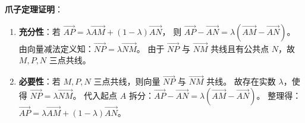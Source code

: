 \begin{proofbox}
\textbf{爪子定理证明}：
\begin{enumerate}
    \item \textbf{充分性}：若 $\vec{AP} = \lambda \vec{AM} + (1 - \lambda) \vec{AN}$，
    则 $\vec{AP} - \vec{AN} = \lambda (\vec{AM} - \vec{AN})$。
    由向量减法定义知：$\vec{NP} = \lambda \vec{NM}$。
    由于 $\vec{NP}$ 与 $\vec{NM}$ 共线且有公共点 $N$，故 $M, P, N$ 三点共线。
    
    \item \textbf{必要性}：若 $M, P, N$ 三点共线，则向量 $\vec{NP}$ 与 $\vec{NM}$ 共线。
    故存在实数 $\lambda$，使得 $\vec{NP} = \lambda \vec{NM}$。
    代入起点 $A$ 拆分：$\vec{AP} - \vec{AN} = \lambda (\vec{AM} - \vec{AN})$。
    整理得：$\vec{AP} = \lambda \vec{AM} + (1 - \lambda) \vec{AN}$。
\end{enumerate}
\end{proofbox}

